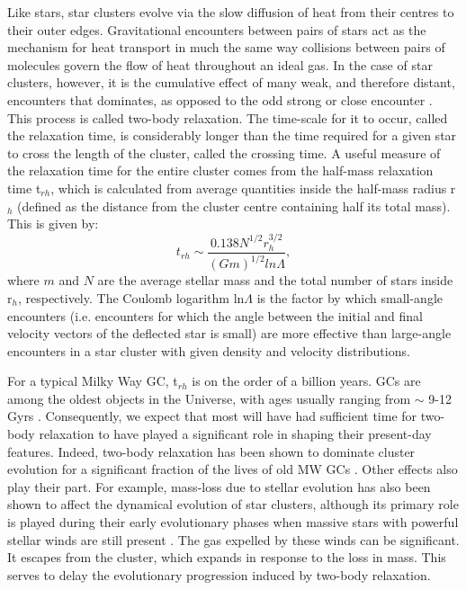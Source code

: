 Like stars, star clusters evolve via the slow diffusion of heat from
their centres to their outer edges.  Gravitational encounters between
pairs of stars act as the mechanism for heat transport in much the
same way collisions between pairs of molecules govern the flow of heat
throughout an ideal gas.  In the case of star clusters, however, it 
is the cumulative effect of many weak, and therefore
distant, encounters that dominates, as opposed to the odd
strong or close encounter \citep{heggie03}.  This process is called
two-body relaxation.  The time-scale for it to occur, called the
relaxation time, is 
considerably longer than the time required for a given star to cross the
length of the cluster, called the crossing time.  A useful measure of the
relaxation time for the entire cluster comes from the half-mass
relaxation time t$_{rh}$, which is calculated from average quantities inside
the half-mass radius r$_h$ (defined as the distance from the cluster centre
containing half its total mass).  This is given by:
\begin{equation}
\label{eqn:t-rh1}
t_{rh} \sim \frac{0.138N^{1/2}r_h^{3/2}}{(Gm)^{1/2}ln\Lambda},
\end{equation}   
where $m$ and $N$ are the average stellar mass and the total number of
stars inside r$_h$, respectively.  The Coulomb logarithm ln$\Lambda$
is the factor by which small-angle encounters (i.e. encounters for
which the angle between
the initial and final velocity vectors of the deflected star is small)
are more effective than large-angle encounters in a star cluster
with given density and velocity distributions.  

For a typical Milky Way GC, t$_{rh}$ is on the order of a
billion years.  GCs are among the oldest objects in the Universe, with
ages usually ranging from $\sim$ 9-12 Gyrs
\citep[e.g.][]{deangeli05}.  Consequently, 
we expect that most will have had sufficient time for two-body
relaxation to have played a significant role in shaping their
present-day features.  Indeed, two-body
relaxation has been shown to dominate cluster evolution for a
significant fraction of the lives of old MW GCs
\citep[e.g.][]{gieles11}.  Other effects also play their part.  For
example, mass-loss due to stellar evolution has 
also been shown to affect the dynamical evolution of star
clusters, although its primary role is played during their early
evolutionary phases when massive stars with powerful stellar winds 
are still present \citep[e.g.][]{applegate86, chernoff90,
  fukushige95}.  The gas expelled by these winds can be significant.
It escapes from the cluster, which expands in response to the loss in
mass.  This serves to delay the evolutionary progression induced by
two-body relaxation.

